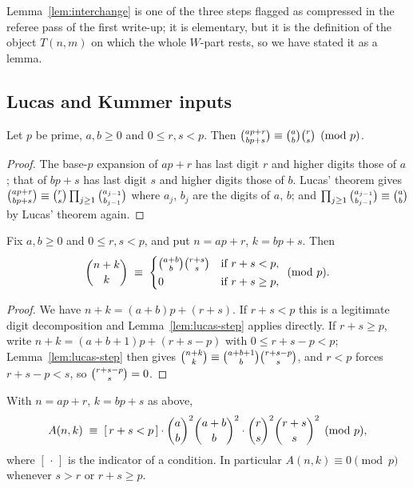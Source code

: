 \begin{remark}
Lemma~\ref{lem:interchange} is one of the three steps flagged as compressed in the
referee pass of the first write-up; it is elementary, but it is the definition of the
object $T(n,m)$ on which the whole $W$-part rests, so we have stated it as a lemma.
\end{remark}

\subsection{Lucas and Kummer inputs}

\begin{lemma}\label{lem:lucas-step}
Let $p$ be prime, $a,b\ge0$ and $0\le r,s<p$. Then
$\binom{ap+r}{bp+s}\equiv\binom{a}{b}\binom{r}{s}\pmod p$.
\end{lemma}

\begin{proof}
The base-$p$ expansion of $ap+r$ has last digit $r$ and higher digits those of $a$; that
of $bp+s$ has last digit $s$ and higher digits those of $b$. Lucas' theorem gives
$\binom{ap+r}{bp+s}\equiv\binom{r}{s}\prod_{j\ge1}\binom{a_{j-1}}{b_{j-1}}$ where $a_j$, $b_j$ are
the digits of $a$, $b$; and $\prod_{j\ge1}\binom{a_{j-1}}{b_{j-1}}\equiv\binom{a}{b}$ by Lucas'
theorem again.
\end{proof}

\begin{lemma}\label{lem:carry-ann}
Fix $a,b\ge0$ and $0\le r,s<p$, and put $n=ap+r$, $k=bp+s$. Then
\[
  \binom{n+k}{k}\;\equiv\;
  \begin{cases}
    \binom{a+b}{b}\binom{r+s}{s} & \text{if }r+s<p,\\[2pt]
    0 & \text{if }r+s\ge p,
  \end{cases}
  \pmod p .
\]
\end{lemma}

\begin{proof}
We have $n+k=(a+b)p+(r+s)$. If $r+s<p$ this is a legitimate digit decomposition and
Lemma~\ref{lem:lucas-step} applies directly. If $r+s\ge p$, write
$n+k=(a+b+1)p+(r+s-p)$ with $0\le r+s-p<p$; Lemma~\ref{lem:lucas-step} then gives
$\binom{n+k}{k}\equiv\binom{a+b+1}{b}\binom{r+s-p}{s}$, and $r<p$ forces $r+s-p<s$, so
$\binom{r+s-p}{s}=0$.
\end{proof}

\begin{lemma}\label{lem:summand}
With $n=ap+r$, $k=bp+s$ as above,
\[
   A(n,k)\;\equiv\;[\,r+s<p\,]\cdot\binom{a}{b}^2\binom{a+b}{b}^2\cdot\binom{r}{s}^2\binom{r+s}{s}^2
   \pmod p,
\]
where $[\,\cdot\,]$ is the indicator of a condition. In particular $A(n,k)\equiv0\pmod p$
whenever $s>r$ or $r+s\ge p$.
\end{lemma}

